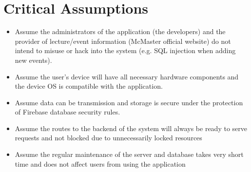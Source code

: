 \documentclass{article}
\begin{document}
\section{Critical Assumptions}

\begin{itemize}
    \item Assume the administrators of the application (the developers) and the provider of lecture/event information (McMaster official website) do not intend to misuse or hack into the system (e.g. SQL injection when adding new events).
    \item Assume the user's device will have all necessary hardware components and the device OS is compatible with the application.
    \item Assume data can be transmission and storage is secure under the protection of Firebase database security rules.
    \item Assume the routes to the backend of the system will always be ready to serve requests and not blocked due to unnecessarily locked resources
    \item Assume the regular maintenance of the server and database takes very short time and does not affect users from using the application
\end{itemize}
\end{document}
